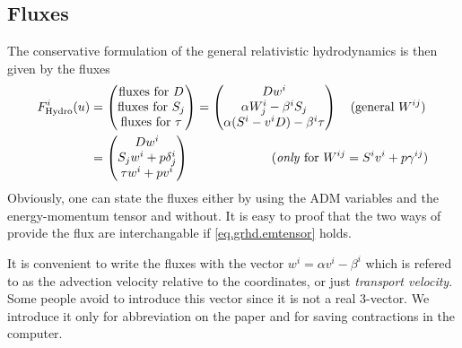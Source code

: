 \documentclass[a4paper]{article}
\newcommand{\hydro}{\text{Hydro}}
\begin{document}
\subsection{Fluxes}
The conservative formulation of the general relativistic hydrodynamics
is then given by the fluxes
\begin{align}
\label{eq.grhd.fluxes}
F^i_\hydro(u) &=
\begin{pmatrix}
\text{fluxes for } D \\
\text{fluxes for } S_j \\
\text{fluxes for } \tau
\end{pmatrix}
=
\begin{pmatrix}
D w^i \\
\alpha W^i_j - \beta^i S_j \\
\alpha (S^i - v^i D) - \beta^i \tau
\end{pmatrix}
\quad
\text{(general $W^{ij}$)}
\\
&=
\begin{pmatrix}
D w^i \\
S_j w^i + p \delta^i_j \\
\tau w^i + p v^i
\end{pmatrix}
\hspace{2.3cm} %
\text{(\emph{only} for $W^{ij}=S^i v^i + p\gamma^{ij}$)}
\end{align}
%
Obviously, one can state the fluxes either by using the ADM variables
and the energy-momentum tensor and without. It is easy to proof that
the two ways of provide the flux are interchangable if \eqref{eq.grhd.emtensor}
holds.

It is convenient to write the fluxes with the vector
$w^i=\alpha v^i - \beta^i$ which is refered to as the advection
velocity relative to the coordinates, or just \emph{transport
velocity}. Some people avoid to introduce this vector since it is
not a real 3-vector. We introduce it only for abbreviation on the
paper and for saving contractions in the computer.
\end{document}
